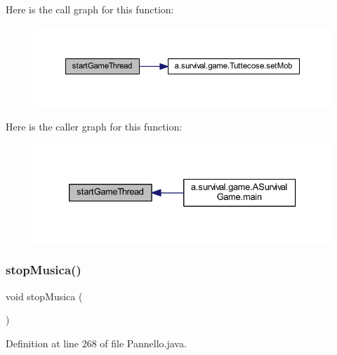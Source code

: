 Here is the call graph for this function\+:
\nopagebreak
\begin{figure}[H]
\begin{center}
\leavevmode
\includegraphics[width=350pt]{classa_1_1survival_1_1game_1_1_pannello_aeadd7c80de430e172e3231afe0d94bd1_cgraph}
\end{center}
\end{figure}
Here is the caller graph for this function\+:
\nopagebreak
\begin{figure}[H]
\begin{center}
\leavevmode
\includegraphics[width=333pt]{classa_1_1survival_1_1game_1_1_pannello_aeadd7c80de430e172e3231afe0d94bd1_icgraph}
\end{center}
\end{figure}
\mbox{\label{classa_1_1survival_1_1game_1_1_pannello_a2e8ba1ecd18a0f6434c051caa55bb9d3}} 
\subsubsection{\texorpdfstring{stop\+Musica()}{stopMusica()}}
{\footnotesize\ttfamily void stop\+Musica (\begin{DoxyParamCaption}{ }\end{DoxyParamCaption})}



Definition at line 268 of file Pannello.\+java.

